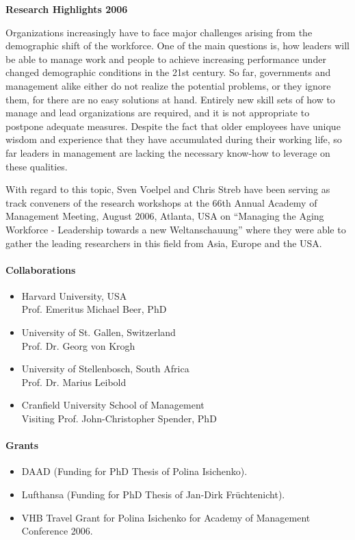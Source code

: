 \null
\textbf{Research Highlights 2006}

 Organizations increasingly have to face major challenges arising from the demographic shift of the workforce. One of the main questions is, how leaders will be able to manage work and people to achieve increasing performance under changed demographic conditions in the 21st century. So far, governments and management alike either do not realize the potential problems, or they ignore them, for there are no easy solutions at hand. Entirely new skill sets of how to manage and lead organizations are required, and it is not appropriate to postpone adequate measures. Despite the fact that older employees have unique wisdom and experience that they have accumulated during their working life, so far leaders in management are lacking the necessary know-how to leverage on these qualities. 

 With regard to this topic, Sven Voelpel and Chris Streb have been serving as track conveners of the research workshops at the 66th Annual Academy of Management Meeting, August 2006, Atlanta, USA on ``Managing the Aging Workforce - Leadership towards a new Weltanschauung'' where they were able to gather the leading researchers in this field from Asia, Europe and the USA. 

\newpage
\paragraph{Collaborations}
\begin{itemize}
\item Harvard University, USA \\ Prof. Emeritus Michael Beer, PhD
\item University of St. Gallen, Switzerland \\ Prof. Dr. Georg von Krogh 
\item University of Stellenbosch, South Africa \\ Prof. Dr. Marius Leibold 
\item Cranfield University School of Management \\ Visiting Prof. John-Christopher Spender, PhD
\end{itemize}

\begin{bibunit}[apalike]
\nocite{*}
\putbib[profSvenVoelpel3]
\end{bibunit}

\paragraph{Grants}
\begin{itemize}
\item DAAD (Funding for PhD Thesis of Polina Isichenko).
\item Lufthansa (Funding for PhD Thesis of Jan-Dirk Fr\"uchtenicht).
\item VHB Travel Grant for Polina Isichenko for Academy of Management Conference 2006.
\end{itemize}